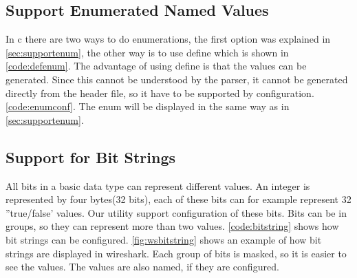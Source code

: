\subsection{Support Enumerated Named Values}
In \Gls{c} there are two ways to do enumerations, the first option was explained in 
\autoref{sec:supportenum}, the other way is to use \gls{define} which is shown in 
\autoref{code:defenum}. The advantage of using \gls{define} is that the values 
can be generated. Since this cannot be understood by the \gls{parser}, it cannot be 
generated directly from the \gls{header} file, so it have to be supported by 
configuration. \autoref{code:enumconf}. The \gls{enum} will be displayed in 
the same way as in \autoref{sec:supportenum}.





\subsection{Support for Bit Strings}
All bits in a basic data type can represent different values. An \gls{integer} is 
represented by four bytes(32 bits), each of these bits can for example represent 
32 ''true/false' values. Our \gls{utility} support configuration of these bits. Bits 
can be in groups, so they can represent more than two values. 
\autoref{code:bitstring} shows how \glspl{bit string} can be configured. 
\autoref{fig:wsbitstring} shows an example of how \glspl{bit string} are displayed in 
\Gls{wireshark}. Each group of bits is masked, so it is easier to see the values. 
The values are also named, if they are configured.


